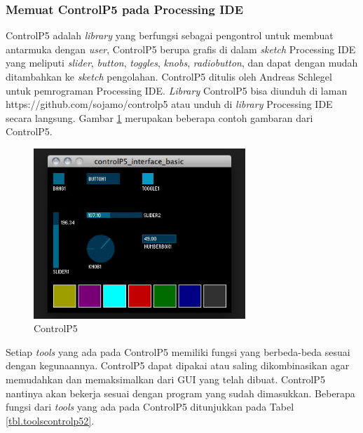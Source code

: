 \subsubsection{ Memuat ControlP5 pada Processing IDE }
ControlP5 adalah \textit{library} yang berfungsi sebagai pengontrol untuk membuat antarmuka dengan \textit{user}, ControlP5 berupa grafis di dalam \textit{sketch} Processing IDE yang meliputi \textit{slider}, \textit{button}, \textit{toggles}, \textit{knobs}, \textit{radiobutton}, dan dapat dengan mudah ditambahkan ke \textit{sketch} pengolahan. ControlP5 ditulis oleh Andreas Schlegel untuk pemrograman Processing IDE. \textit{Library} ControlP5 bisa diunduh di laman https://github.com/sojamo/controlp5 atau unduh di \textit{library} Processing IDE secara langsung. Gambar \ref{pic.controlp5} merupakan beberapa contoh gambaran dari ControlP5.
\begin{figure}[H]
	\centering
	\includegraphics[width=8cm]{gambar/controlp5.jpg}
	\caption{ControlP5}
	\label{pic.controlp5}
\end{figure}
Setiap \textit{tools} yang ada pada ControlP5 memiliki fungsi yang berbeda-beda sesuai dengan kegunaannya. ControlP5 dapat dipakai atau saling dikombinasikan agar memudahkan dan memaksimalkan dari GUI yang telah dibuat. ControlP5 nantinya akan bekerja sesuai dengan program yang sudah dimasukkan. Beberapa fungsi dari \textit{tools} yang ada pada ControlP5 ditunjukkan pada Tabel \ref{tbl.toolscontrolp52}.
